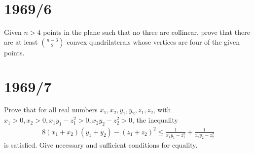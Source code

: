 \documentclass{article}
\begin{document}
\section*{1969/6}
Given $n > 4$ points in the plane such that no three are collinear, prove that there are at least $\binom{n-3}{2}$ convex quadrilaterals whose vertices are four of the given points.

\section*{1969/7}
Prove that for all real numbers $x_1, x_2, y_1, y_2, z_1, z_2$, with $x_1 > 0, x_2 > 0, x_1 y_1 - z_1^2 > 0, x_2 y_2 - z_2^2 > 0$, the inequality
\begin{align}
    8(x_1 + x_2)(y_1 + y_2) - (z_1 + z_2)^2 \leq \frac{1}{x_1 y_1 - z_1^2} + \frac{1}{x_2 y_2 - z_2^2}
\end{align}
is satisfied. Give necessary and sufficient conditions for equality.
\end{document}
